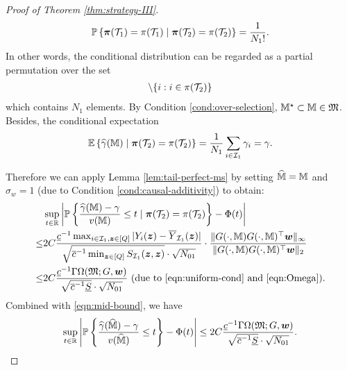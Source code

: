 \documentclass[12pt]{article}
\begin{document}
{\begin{proof}[Proof of Theorem \ref{thm:strategy-III}]
\begin{align*}
    {{\mathbb{P}}\left\{\boldsymbol{\pi}({\mathcal{T}}_1) = \pi({\mathcal{T}}_1) \mid \boldsymbol{\pi}({\mathcal{T}}_2) = \pi({\mathcal{T}}_2)\right\}} = \frac{1}{N_1!}.
\end{align*}
In other words, the conditional distribution can be regarded as a partial permutation over the set 
\begin{align*}
    [N]\backslash\{i:i\in \pi(\cT_2)\}
\end{align*}
which contains $N_1$ elements. 
By Condition \ref{cond:over-selection}, ${\mathbb{M}}^\star\subset {\mathbb{M}}\in\mathfrak{M}$.
Besides, the conditional expectation
\begin{align*}
    {{\mathbb{E}}\left\{{\widehat{\gamma}}({\mathbb{M}})\mid \boldsymbol{\pi}({\mathcal{T}}_2) = \pi({\mathcal{T}}_2)\right\}} = \frac{1}{N_1}\sum_{i\in{\mathcal{I}}_1} \gamma_i = \gamma.
\end{align*}


Therefore we can apply Lemma \ref{lem:tail-perfect-ms} by setting $\widehat{{\mathbb{M}}} = {\mathbb{M}}$ and $\sigma_w=1$ (due to Condition \eqref{cond:causal-additivity}) to obtain:
\begin{align}
&\sup_{t\in{\mathbb{R}}}\left|{{\mathbb{P}}\left\{\frac{{\widehat{\gamma}}({\mathbb{M}}) - \gamma}{v({\mathbb{M}})} \le t  \mid  \boldsymbol{\pi}({\mathcal{T}}_2) = \pi({\mathcal{T}}_2)\right\}} - \Phi(t)\right|\notag\\ 
\le &
2C  \frac{\underline{c}^{-1} \max_{i\in{\mathcal{I}}_1,{\boldsymbol{z}}\in[Q]}|Y_i({\boldsymbol{z}})-\overline{Y}_{{\mathcal{I}}_1}({\boldsymbol{z}})|}{\sqrt{\overline{c}^{-1} \min_{{\boldsymbol{z}}\in[Q]} S_{{\mathcal{I}}_1}({\boldsymbol{z}},{\boldsymbol{z}})}\cdot \sqrt{N_{01}}}\cdot \frac{\|G(\cdot, {\mathbb{M}})G(\cdot, {\mathbb{M}})^\top {\boldsymbol{w}}\|_\infty}{\|G(\cdot, {\mathbb{M}})G(\cdot, {\mathbb{M}})^\top {\boldsymbol{w}}\|_2}\notag\\
\le & 
2C  \frac{\underline{c}^{-1} \Gamma\Omega(\mathfrak{M};G,{\boldsymbol{w}})}{\sqrt{\overline{c}^{-1} \underline{S}}\cdot \sqrt{N_{01}}} \text{ (due to \eqref{eqn:uniform-cond} and \eqref{eqn:Omega})}.\label{eqn:conditional-be}
\end{align}
Combined with \eqref{eqn:mid-bound}, we have
\begin{align*}
    \sup_{t\in{\mathbb{R}}}\left|{{\mathbb{P}}\left\{\frac{{\widehat{\gamma}}(\widehat{{\mathbb{M}}}) - \gamma}{v(\widehat{{\mathbb{M}}})} \le t\right\}} - \Phi(t)\right| \le 2C   \frac{\underline{c}^{-1} \Gamma\Omega(\mathfrak{M};G,{\boldsymbol{w}})}{\sqrt{\overline{c}^{-1} \underline{S}}\cdot \sqrt{N_{01}}}.
\end{align*}
\end{proof}
}




\end{document}
